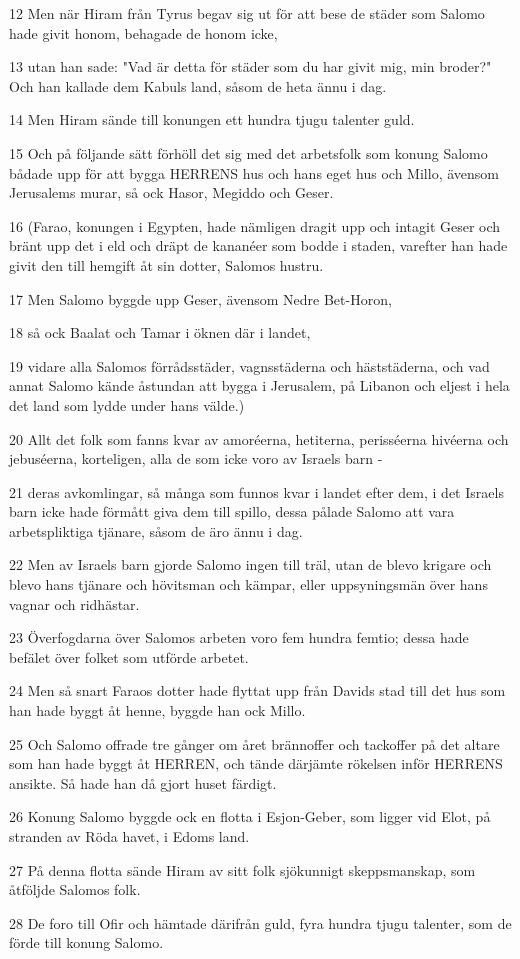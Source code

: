 \par 12 Men när Hiram från Tyrus begav sig ut för att bese de städer som Salomo hade givit honom, behagade de honom icke,
\par 13 utan han sade: "Vad är detta för städer som du har givit mig, min broder?" Och han kallade dem Kabuls land, såsom de heta ännu i dag.
\par 14 Men Hiram sände till konungen ett hundra tjugu talenter guld.
\par 15 Och på följande sätt förhöll det sig med det arbetsfolk som konung Salomo bådade upp för att bygga HERRENS hus och hans eget hus och Millo, ävensom Jerusalems murar, så ock Hasor, Megiddo och Geser.
\par 16 (Farao, konungen i Egypten, hade nämligen dragit upp och intagit Geser och bränt upp det i eld och dräpt de kananéer som bodde i staden, varefter han hade givit den till hemgift åt sin dotter, Salomos hustru.
\par 17 Men Salomo byggde upp Geser, ävensom Nedre Bet-Horon,
\par 18 så ock Baalat och Tamar i öknen där i landet,
\par 19 vidare alla Salomos förrådsstäder, vagnsstäderna och häststäderna, och vad annat Salomo kände åstundan att bygga i Jerusalem, på Libanon och eljest i hela det land som lydde under hans välde.)
\par 20 Allt det folk som fanns kvar av amoréerna, hetiterna, perisséerna hivéerna och jebuséerna, korteligen, alla de som icke voro av Israels barn -
\par 21 deras avkomlingar, så många som funnos kvar i landet efter dem, i det Israels barn icke hade förmått giva dem till spillo, dessa pålade Salomo att vara arbetspliktiga tjänare, såsom de äro ännu i dag.
\par 22 Men av Israels barn gjorde Salomo ingen till träl, utan de blevo krigare och blevo hans tjänare och hövitsman och kämpar, eller uppsyningsmän över hans vagnar och ridhästar.
\par 23 Överfogdarna över Salomos arbeten voro fem hundra femtio; dessa hade befälet över folket som utförde arbetet.
\par 24 Men så snart Faraos dotter hade flyttat upp från Davids stad till det hus som han hade byggt åt henne, byggde han ock Millo.
\par 25 Och Salomo offrade tre gånger om året brännoffer och tackoffer på det altare som han hade byggt åt HERREN, och tände därjämte rökelsen inför HERRENS ansikte. Så hade han då gjort huset färdigt.
\par 26 Konung Salomo byggde ock en flotta i Esjon-Geber, som ligger vid Elot, på stranden av Röda havet, i Edoms land.
\par 27 På denna flotta sände Hiram av sitt folk sjökunnigt skeppsmanskap, som åtföljde Salomos folk.
\par 28 De foro till Ofir och hämtade därifrån guld, fyra hundra tjugu talenter, som de förde till konung Salomo.

